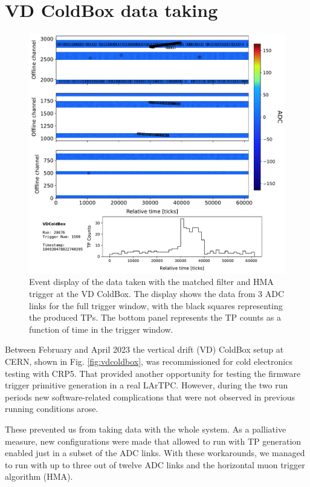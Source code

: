 \section{VD ColdBox data taking}
\label{sec:matched_filter_vdcoldbox}

\begin{figure}[t]
    \centering
    \includegraphics[scale = 0.5]{Images/Matched_Filter/TRDisplay_np02_coldbox_run020676_0001.pdf}
    \caption[Event display of the data taken with the matched filter and HMA trigger at the VD ColdBox.]{Event display of the data taken with the matched filter and HMA trigger at the VD ColdBox. The display shows the data from 3 ADC links for the full trigger window, with the black squares representing the produced TPs. The bottom panel represents the TP counts as a function of time in the trigger window.}
    \label{fig:example_hma_evd}
\end{figure}

Between February and April 2023 the vertical drift (VD) ColdBox setup at CERN, shown in Fig. \ref{fig:vdcoldbox}, was recommissioned for cold electronics testing with CRP5. That provided another opportunity for testing the firmware trigger primitive generation in a real LArTPC. However, during the two run periods new software-related complications that were not observed in previous running conditions arose.

These prevented us from taking data with the whole system. As a palliative measure, new configurations were made that allowed to run with TP generation enabled just in a subset of the ADC links. With these workarounds, we managed to run with up to three out of twelve ADC links and the horizontal muon trigger algorithm (HMA).

